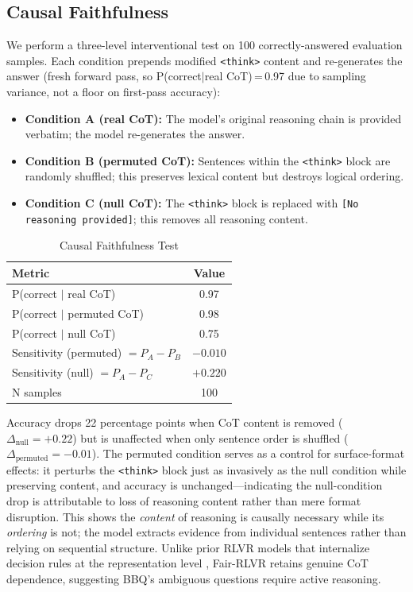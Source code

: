 \documentclass[conference]{IEEEtran}
\begin{document}
\subsection{Causal Faithfulness}

We perform a three-level interventional test on 100 correctly-answered evaluation samples. Each condition prepends modified \texttt{<think>} content and re-generates the answer (fresh forward pass, so P(correct$\mid$real CoT)\,=\,0.97 due to sampling variance, not a floor on first-pass accuracy):
\begin{itemize}
    \item \textbf{Condition A (real CoT):} The model's original reasoning chain is provided verbatim; the model re-generates the answer.
    \item \textbf{Condition B (permuted CoT):} Sentences within the \texttt{<think>} block are randomly shuffled; this preserves lexical content but destroys logical ordering.
    \item \textbf{Condition C (null CoT):} The \texttt{<think>} block is replaced with \texttt{[No reasoning provided]}; this removes all reasoning content.
\end{itemize}

\begin{table}[htbp]
\caption{Causal Faithfulness Test}
\begin{center}
\begin{tabular}{lc}
\toprule
\textbf{Metric} & \textbf{Value} \\
\midrule
P(correct $\mid$ real CoT) & 0.97 \\
P(correct $\mid$ permuted CoT) & 0.98 \\
P(correct $\mid$ null CoT) & 0.75 \\
Sensitivity (permuted) $= P_A - P_B$ & $-0.010$ \\
Sensitivity (null) $= P_A - P_C$     & $+0.220$ \\
N samples & 100 \\
\bottomrule
\end{tabular}
\label{tab:faithfulness}
\end{center}
\end{table}

Accuracy drops 22 percentage points when CoT content is removed ($\Delta_{\text{null}} = +0.22$) but is unaffected when only sentence order is shuffled ($\Delta_{\text{permuted}} = -0.01$). The permuted condition serves as a control for surface-format effects: it perturbs the \texttt{<think>} block just as invasively as the null condition while preserving content, and accuracy is unchanged---indicating the null-condition drop is attributable to loss of reasoning content rather than mere format disruption. This shows the \textit{content} of reasoning is causally necessary while its \textit{ordering} is not; the model extracts evidence from individual sentences rather than relying on sequential structure. Unlike prior RLVR models that internalize decision rules at the representation level \cite{deepseekr1}, Fair-RLVR retains genuine CoT dependence, suggesting BBQ's ambiguous questions require active reasoning.
\end{document}
